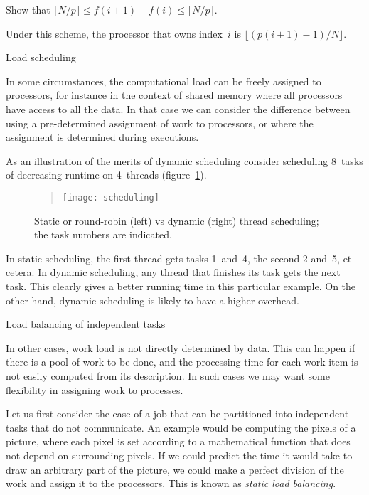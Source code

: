 \begin{exercise}
Show that $\lfloor N/p\rfloor \leq f(i+1)-f(i)\leq \lceil N/p\rceil$.
\end{exercise}

Under this scheme, the processor that owns index~$i$ is
$\lfloor (p(i+1)-1)/N \rfloor$.

 {Load scheduling}
\label{sec:load-schedule}

In some circumstances, the computational load can be freely assigned
to processors, for instance in the context of shared memory where all
processors have access to all the data. In that case we can consider
the difference between  using a
pre-determined assignment of work to processors, or
 where the assignment is determined
during executions.

As an illustration of the merits of dynamic scheduling consider
scheduling 8~tasks of decreasing runtime on 4~threads
(figure~\ref{fig:staticdynamic}).
%
\begin{figure}[ht]
  \begin{quote}
  \texttt{[image: scheduling]}
  \end{quote}
  \caption{Static or round-robin (left) vs dynamic (right) thread
    scheduling; the task numbers are indicated.}
  \label{fig:staticdynamic}
\end{figure}
%
In static scheduling, the first thread gets
tasks 1~and~4, the second 2 and~5, et cetera. In dynamic scheduling,
any thread that finishes its task gets the next task. This clearly
gives a better running time in this particular example. On the other
hand, dynamic scheduling is likely to have a higher overhead.

 {Load balancing of independent tasks}

In other cases, work load is not directly determined by data.
This can happen if there is a pool of work to be done,
and the processing time for each work item is not 
easily computed from its description. In such cases
we may want some flexibility in assigning work to processes.

Let us first consider the case of a job that can be partitioned into
independent tasks that do not communicate. An example would be
computing the pixels of a  picture, where
each pixel is set according to a mathematical function that does not
depend on surrounding pixels. If we could predict the time it would
take to draw an arbitrary part of the picture, we could make a perfect
division of the work and assign it to the processors. This is known as
\emph{static load balancing}.


